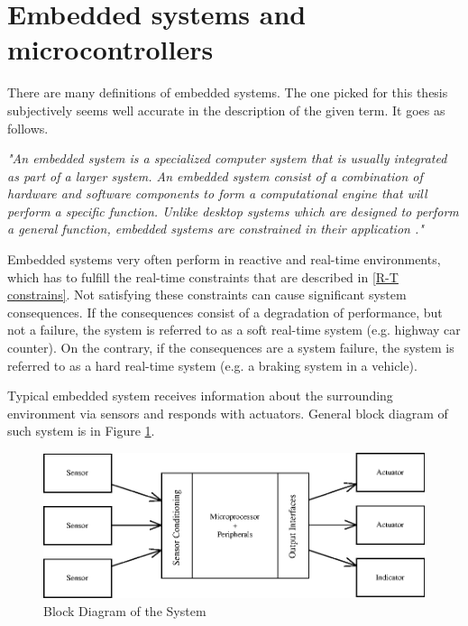 \documentclass[twoside]{ctuthesis}
\theoremstyle{plain}
\theoremstyle{definition}
\theoremstyle{note}
\begin{document}
\section{Embedded systems and microcontrollers}
There are many definitions of embedded systems. The one picked for this thesis subjectively seems well accurate in the description of the given term. It goes as follows.

\textit{"An embedded system is a specialized computer system that is usually integrated as part of a larger system. An embedded system consist of a combination of hardware and software components to form a computational engine that will perform a specific function. Unlike desktop systems which are designed to perform a general function, embedded systems are constrained in their application \cite{cite:SE_for_ES}."}

Embedded systems very often perform in reactive and real-time environments, which has to fulfill the real-time constraints that are described in \ref{R-T constrains}. Not satisfying these constraints can cause significant system consequences. If the consequences consist of a degradation of performance, but not a failure, the system is referred to as a soft real-time system (e.g. highway car counter). On the contrary, if the consequences are a system failure, the system is referred to as a hard real-time system (e.g. a braking system in a vehicle). 

Typical embedded system receives information about the surrounding environment via sensors and responds with actuators. General block diagram of such system is in Figure \ref{fig:generalEmbedded}.                                                                    

\begin{figure}[h]
	\centering
	\includegraphics[width=1.0\textwidth]{generalEmbedded.eps}
	\caption{Block Diagram of the System \cite{cite:SE_for_ES}}
	\label{fig:generalEmbedded}
\end{figure}
\end{document}
